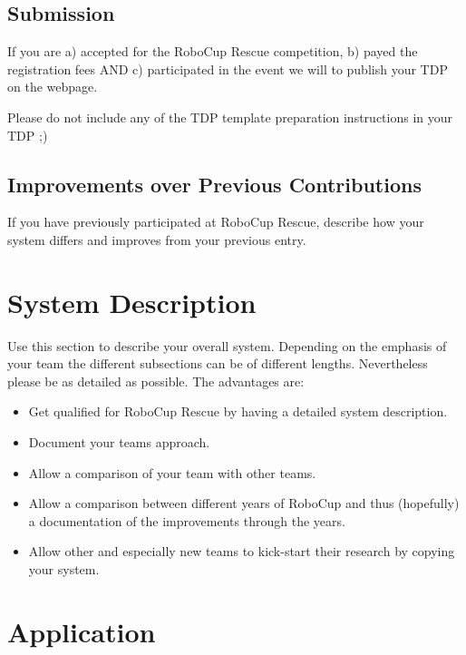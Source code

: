 \documentclass[journal]{IEEEtran}
\begin{document}
\subsection{Submission}
If you are a) accepted for the RoboCup Rescue competition, b) payed the registration fees AND c) participated in the event we will to publish your TDP on the webpage. 

Please do not include any of the TDP template preparation instructions in your TDP ;)

\subsection{Improvements over Previous Contributions}
If you have previously participated at RoboCup Rescue, describe how your system differs and improves from your previous entry. 

\section{System Description}
Use this section to describe your overall system. Depending on the emphasis of your team the different subsections can be of different lengths. Nevertheless please be as detailed as possible. The advantages are:

\begin{itemize}
 \item Get qualified for RoboCup Rescue by having a detailed system description.
 \item Document your teams approach.
 \item Allow a comparison of your team with other teams.
 \item Allow a comparison between different years of RoboCup and thus (hopefully) a documentation of the improvements through the years.
 \item Allow other and especially new teams to kick-start their research by copying your system.
\end{itemize}






\section{Application}

\end{document}
